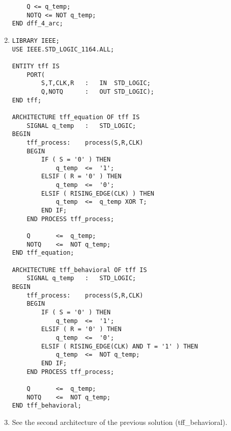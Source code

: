 \begin{enumerate}
\begin{lstlisting}
	Q <= q_temp;
	NOTQ <= NOT q_temp;
END dff_4_arc;
	\end{lstlisting}

	\item \begin{lstlisting}
LIBRARY IEEE;
USE IEEE.STD_LOGIC_1164.ALL;

ENTITY tff IS
	PORT(
		S,T,CLK,R	:	IN	STD_LOGIC;
		Q,NOTQ		:	OUT	STD_LOGIC);
END tff;

ARCHITECTURE tff_equation OF tff IS
	SIGNAL q_temp	:	STD_LOGIC;
BEGIN
	tff_process:	process(S,R,CLK) 
	BEGIN
		IF ( S = '0' ) THEN
			q_temp	<=	'1';
		ELSIF ( R = '0' ) THEN
			q_temp	<=	'0';
		ELSIF ( RISING_EDGE(CLK) ) THEN
			q_temp	<=	q_temp XOR T;
		END IF;
	END PROCESS tff_process;

	Q		<=	q_temp;
	NOTQ	<=	NOT q_temp;
END tff_equation;

ARCHITECTURE tff_behavioral OF tff IS
	SIGNAL q_temp	:	STD_LOGIC;
BEGIN
	tff_process:	process(S,R,CLK) 
	BEGIN
		IF ( S = '0' ) THEN
			q_temp	<=	'1';
		ELSIF ( R = '0' ) THEN
			q_temp	<=	'0';
		ELSIF ( RISING_EDGE(CLK) AND T = '1' ) THEN
			q_temp	<=	NOT q_temp;
		END IF;
	END PROCESS tff_process;

	Q		<=	q_temp;
	NOTQ	<=	NOT q_temp;
END tff_behavioral;
	\end{lstlisting}

	\item See the second architecture of the previous solution (tff\_behavioral).
\end{enumerate}

